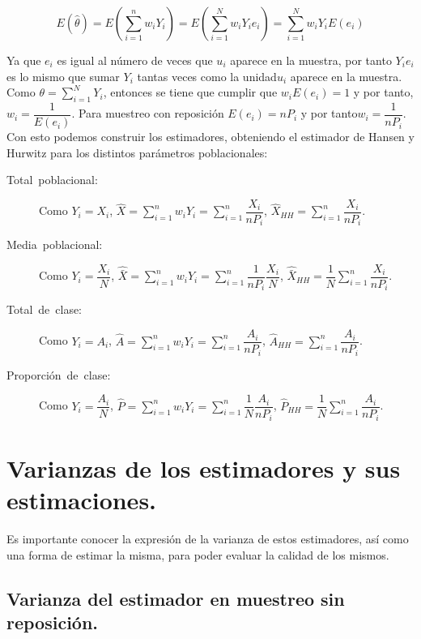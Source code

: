 \[
E\left(\hat{\theta}\right)=E\left(\sum_{i=1}^{n}w_{i}Y_{i}\right)=E\left(\sum_{i=1}^{N}w_{i}Y_{i}e_{i}\right)=\sum_{i=1}^{N}w_{i}Y_{i}E\left(e_{i}\right)
\]


Ya que $e_{i}$ es igual al n\'umero de veces que $u_{i}$ aparece en
la muestra, por tanto $Y_{i}e_{i}$ es lo mismo que sumar $Y_{i}$
tantas veces como la unidad$u_{i}$ aparece en la muestra. Como $\theta=\sum_{i=1}^{N}Y_{i}$,
entonces se tiene que cumplir que $w_{i}E\left(e_{i}\right)=1$ y
por tanto, $w_{i}=\dfrac{1}{E\left(e_{i}\right)}$. Para muestreo
con reposici\'on $E\left(e_{i}\right)=nP_{i}$ y por tanto$w_{i}=\dfrac{1}{nP_{i}}$.
Con esto podemos construir los estimadores, obteniendo el estimador
de Hansen y Hurwitz para los distintos par\'ametros poblacionales:
\begin{description}
\item [{Total~poblacional:}] Como $Y_{i}=X_{i}$, $\hat{X}=\sum_{i=1}^{n}w_{i}Y_{i}=\sum_{i=1}^{n}\dfrac{X_{i}}{nP_{i}}$,
$\hat{X}_{HH}=\sum_{i=1}^{n}\dfrac{X_{i}}{nP_{i}}$.
\item [{Media~poblacional:}] Como $Y_{i}=\dfrac{X_{i}}{N}$, $\hat{\bar{X}}=\sum_{i=1}^{n}w_{i}Y_{i}=\sum_{i=1}^{n}\dfrac{1}{nP_{i}}\dfrac{X_{i}}{N}$,
$\hat{\bar{X}}_{HH}=\dfrac{1}{N}\sum_{i=1}^{n}\dfrac{X_{i}}{nP_{i}}$.
\item [{Total~de~clase:}] Como $Y_{i}=A_{i}$, $\hat{A}=\sum_{i=1}^{n}w_{i}Y_{i}=\sum_{i=1}^{n}\dfrac{A_{i}}{nP_{i}}$,
$\hat{A}_{HH}=\sum_{i=1}^{n}\dfrac{A_{i}}{nP_{i}}$.
\item [{Proporci\'on~de~clase:}] Como $Y_{i}=\dfrac{A_{i}}{N}$, $\hat{P}=\sum_{i=1}^{n}w_{i}Y_{i}=\sum_{i=1}^{n}\dfrac{1}{N}\dfrac{A_{i}}{nP_{i}}$,
$\hat{P}_{HH}=\dfrac{1}{N}\sum_{i=1}^{n}\dfrac{A_{i}}{nP_{i}}$.
\end{description}

\section{Varianzas de los estimadores y sus estimaciones.}

Es importante conocer la expresi\'on de la varianza de estos estimadores,
as\'i como una forma de estimar la misma, para poder evaluar la calidad
de los mismos.


\subsection{Varianza del estimador en muestreo sin reposici\'on.}

